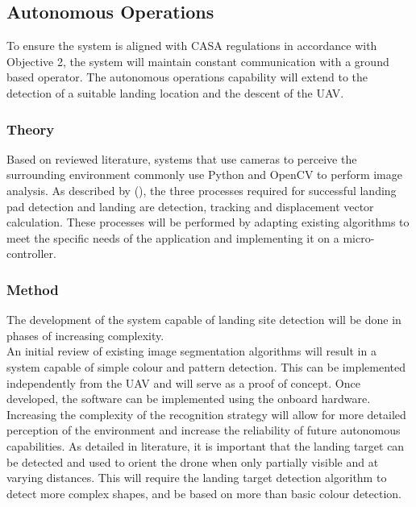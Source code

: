 
\subsection{Autonomous Operations}
\label{sec:autonomous}

To ensure the system is aligned with CASA regulations in accordance with Objective 2, the system will maintain constant communication with a ground based operator. The autonomous operations capability will extend to the detection of a suitable landing location and the descent of the UAV.

\subsubsection{Theory}

Based on reviewed literature, systems that use cameras to perceive the surrounding environment commonly use Python and OpenCV to perform image analysis. As described by \citeauthor{Tom5} (\citeyear{Tom5}), the three processes required for successful landing pad detection and landing are detection, tracking and displacement vector calculation. These processes will be performed by adapting existing algorithms to meet the specific needs of the application and implementing it on a micro-controller.




\subsubsection{Method}

The development of the system capable of landing site detection will be done in phases of increasing complexity.\\

An initial review of existing image segmentation algorithms will result in a system capable of simple colour and pattern detection. This can be implemented independently from the UAV and will serve as a proof of concept. Once developed, the software can be implemented using the onboard hardware.\\

Increasing the complexity of the recognition strategy will allow for more detailed perception of the environment and increase the reliability of future autonomous capabilities. As detailed in literature, it is important that the landing target can be detected and used to orient the drone when only partially visible and at varying distances. This will require the landing target detection algorithm to detect more complex shapes, and be based on more than basic colour detection.\\

